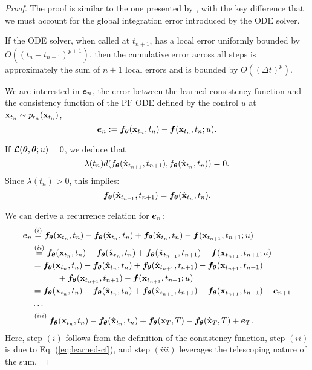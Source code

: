 \begin{proof}
    The proof is similar to the one presented by \citet{song2023consistency}, with the key difference that we must account for the global integration error introduced by the ODE solver.

    If the ODE solver, when called at $t_{n+1}$, has a local error uniformly bounded by $O((t_{n} - t_{n-1})^{p+1})$, then the cumulative error across all steps is approximately the sum of $n+1$ local errors and is bounded by $O((\Delta t)^p)$.

    We are interested in ${\bm{e}}_n$, the error between the learned consistency function and the consistency function of the PF ODE defined by the control $u$ at ${\mathbf{x}}_{t_n} \sim p_{t_n}({\mathbf{x}}_{t_n})$,
    $$
    {\bm{e}}_n:={\bm{f}}_{\bm{\theta}}({\mathbf{x}}_{t_n}, t_n) - {\bm{f}}({\mathbf{x}}_{t_n}, t_n; u). 
    $$
        
    If $\mathcal{L}({\bm{\theta}}, {\bm{\theta}}; u) = 0$, we deduce that
    $$
    \lambda(t_n) d(f_{{\bm{\theta}}}(\hat{{\mathbf{x}}}_{t_{n+1}}, t_{n+1}), f_{{\bm{\theta}}}(\hat{{\mathbf{x}}}_{t_{n}}, t_n)) = 0.
    $$
    Since $\lambda(t_n) > 0$, this implies:
    \begin{equation}\label{eq:learned-cf}
        {\bm{f}}_{\bm{\theta}}(\hat {{\mathbf{x}}}_{t_{n+1}}, t_{n+1}) = {\bm{f}}_{\bm{\theta}}(\hat {{\mathbf{x}}}_{t_{n}}, t_{n}).
    \end{equation}

    We can derive a recurrence relation for ${\bm{e}}_n$:
    \begin{align*}
        {\bm{e}}_n &\overset{(i)}{=}  {\bm{f}}_{\bm{\theta}}({\mathbf{x}}_{t_n}, t_n) - {\bm{f}}_{\bm{\theta}}(\hat{{\mathbf{x}}}_{t_n}, t_n) + {\bm{f}}_{\bm{\theta}}(\hat{{\mathbf{x}}}_{t_n}, t_n) - {\bm{f}}({\mathbf{x}}_{t_{n+1}}, t_{n+1}; u)\\
        &\overset{(ii)}{=} {\bm{f}}_{\bm{\theta}}({\mathbf{x}}_{t_n}, t_n) - {\bm{f}}_{\bm{\theta}}(\hat{{\mathbf{x}}}_{t_n}, t_n) + {\bm{f}}_{\bm{\theta}}(\hat{{\mathbf{x}}}_{t_{n+1}}, t_{n+1}) - {\bm{f}}({\mathbf{x}}_{t_{n+1}}, t_{n+1}; u)\\
        &= {\bm{f}}_{\bm{\theta}}({\mathbf{x}}_{t_n}, t_n) - {\bm{f}}_{\bm{\theta}}(\hat{{\mathbf{x}}}_{t_n}, t_n) + {\bm{f}}_{\bm{\theta}}(\hat{{\mathbf{x}}}_{t_{n+1}}, t_{n+1}) - {\bm{f}}_{\bm{\theta}}({\mathbf{x}}_{t_{n+1}}, t_{n+1})\\
                &\quad\quad\quad + {\bm{f}}_{\bm{\theta}}({\mathbf{x}}_{t_{n+1}}, t_{n+1}) - {\bm{f}}({\mathbf{x}}_{t_{n+1}}, t_{n+1}; u)\\
         &= {\bm{f}}_{\bm{\theta}}({\mathbf{x}}_{t_n}, t_n) - {\bm{f}}_{\bm{\theta}}(\hat{{\mathbf{x}}}_{t_n}, t_n) + {\bm{f}}_{\bm{\theta}}(\hat{{\mathbf{x}}}_{t_{n+1}}, t_{n+1}) - {\bm{f}}_{\bm{\theta}}({\mathbf{x}}_{t_{n+1}}, t_{n+1}) + {\bm{e}}_{n+1}\\
         &\ldots\\
        &\overset{(iii)}{=} {\bm{f}}_{\bm{\theta}}({\mathbf{x}}_{t_n}, t_n) - {\bm{f}}_{\bm{\theta}}(\hat{{\mathbf{x}}}_{t_n}, t_n) + {\bm{f}}_{\bm{\theta}}({\mathbf{x}}_{T}, T) - {\bm{f}}_{\bm{\theta}}(\hat{{\mathbf{x}}}_{T}, T) + {\bm{e}}_T.
    \end{align*}
    Here, step $(i)$ follows from the definition of the consistency function, step $(ii)$ is due to Eq. (\ref{eq:learned-cf}), and step $(iii)$ leverages the telescoping nature of the sum.


\end{proof}
